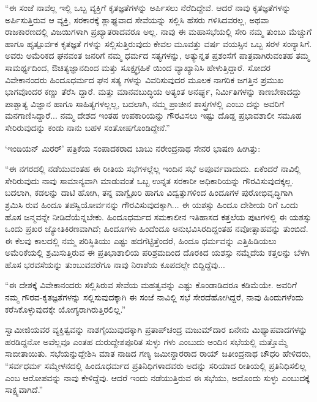 “ಈ ಸಂಜೆ ನಾವೆಲ್ಲ ಇಲ್ಲಿ ಒಬ್ಬ ವ್ಯಕ್ತಿಗೆ ಕೃತಜ್ಞತೆಗಳನ್ನು ಅರ್ಪಿಸಲು ನೆರೆದಿದ್ದೇವೆ. ಆದರೆ ನಾವು ಕೃತಜ್ಞತೆಗಳನ್ನು ಅರ್ಪಿಸುತ್ತಿರುವ ಆ ವ್ಯಕ್ತಿ, ಸರಕಾರಕ್ಕೆ ಶ್ಲಾಘ್ಯವಾದ ಸೇವೆಯನ್ನು ಸಲ್ಲಿಸಿ ಹೆಸರು ಗಳಿಸಿದವರಲ್ಲ, ಅಥವಾ ರಾಜಕಾರಣದಲ್ಲಿ ವಿಜಯಿಗಳಾಗಿ ಪ್ರಖ್ಯಾತರಾದವರೂ ಅಲ್ಲ. ನಾವು ಈ ಮಹಾಸಭೆಯಲ್ಲಿ ಸೇರಿ ನಮ್ಮ ತುಂಬು ಮೆಚ್ಚುಗೆ ಹಾಗೂ ಹೃತ್ಪೂರ್ವಕ ಕೃತಜ್ಞತೆ ಗಳನ್ನು ಸಲ್ಲಿಸುತ್ತಿರುವುದು ಕೇವಲ ಮೂವತ್ತು ವರ್ಷ ವಯಸ್ಸಿನ ಒಬ್ಬ ಸರಳ ಸಂನ್ಯಾಸಿಗೆ. ಅವರು ಅಮೆರಿಕದ ಘನವಂತ ಜನರಿಗೆ ನಮ್ಮ ಧರ್ಮದ ಸತ್ಯಗಳನ್ನು, ಅತ್ಯುನ್ನತ ಪ್ರಶಂಸೆಗೆ ಪಾತ್ರವಾಗಿರುವಂತಹ ತಮ್ಮ ಸಾಮರ್ಥ್ಯದಿಂದ, ಔಚಿತ್ಯಜ್ಞಾನದಿಂದ ಮತ್ತು ಸೂಕ್ಷ್ಮಗ್ರಹಿಕೆ ಯಿಂದ ವ್ಯಾಖ್ಯಾನಿಸಿ ಹೇಳುತ್ತಿದ್ದಾರೆ. ಸೋದರ ವಿವೇಕಾನಂದರು ಹಿಂದೂಧರ್ಮದ ಘನ ಸತ್ಯ ಗಳನ್ನು ವಿವರಿಸುವುದರ ಮೂಲಕ ನಾಗರಿಕ ಜಗತ್ತಿನ ಪ್ರಮುಖ ಭಾಗವೊಂದರ ಕಣ್ಣು ತೆರೆಸಿ ದ್ದಾರೆ. ಮತ್ತು ಮಾನವಬುದ್ಧಿಯ ಅತ್ಯಂತ ಅನರ್ಘ್ಯ, ನಿರ್ಮಿತಿಗಳನ್ನು ಕಾಣಬೇಕಾದದ್ದು ಪಾಶ್ಚಾತ್ಯ ವಿಜ್ಞಾನ ಹಾಗೂ ಸಾಹಿತ್ಯಗಳಲ್ಲಲ್ಲ, ಬದಲಾಗಿ, ನಮ್ಮ ಪ್ರಾಚೀನ ಶಾಸ್ತ್ರಗಳಲ್ಲಿ ಎಂಬು ದನ್ನು ಅವರಿಗೆ ಮನಗಾಣಿಸಿದ್ದಾರೆ... ನಮ್ಮ ದೇಶದ ಇಂತಹ ಉಪಕಾರಿಯನ್ನು ಗೌರವಿಸಲು ಇಷ್ಟು ದೊಡ್ಡ ಪ್ರಭಾವಶಾಲೀ ಸಮೂಹ ಸೇರಿರುವುದನ್ನು ಕಂಡು ನಾನು ಬಹಳ ಸಂತೋಷಗೊಂಡಿದ್ದೇನೆ.”

‘ಇಂಡಿಯನ್ ಮಿರರ್​’ ಪತ್ರಿಕೆಯ ಸಂಪಾದಕರಾದ ಬಾಬು ನರೇಂದ್ರನಾಥ ಸೇನರ ಭಾಷಣ ಹೀಗಿತ್ತು:

“ಈ ನಗರದಲ್ಲಿ ನಡೆಯುವಂತಹ ಈ ರೀತಿಯ ಸಭೆಗಳಲ್ಲೆಲ್ಲ ಇಂದಿನ ಸಭೆ ಅಪೂರ್ವವಾದುದು. ಏಕೆಂದರೆ ನಾವಿಲ್ಲಿ ಸೇರಿರುವುದು ನಾವು ಸಾಮಾನ್ಯವಾಗಿ ಮಾಡುವಂತೆ ಒಬ್ಬ ಉನ್ನತ ಸರಕಾರೀ ಅಧಿಕಾರಿಯನ್ನು ಗೌರವಿಸುವುದಕ್ಕಲ್ಲ. ಬದಲಾಗಿ, ಕಡಲನ್ನು ದಾಟಿ ಹೋಗಿ, ತನ್ನ ವಾಗ್ವೈಖರಿ ಹಾಗೂ ವಿದ್ವತ್ತುಗಳಿಂದ ಹಿಂದೂಗಳ ಪುರೋಭಿವೃದ್ಧಿಗಾಗಿ ಶ್ರಮಿಸಿ ರುವ ಹಿಂದೂ ತಪಸ್ವಿಯೋರ್ವನನ್ನು ಗೌರವಿಸುವುದಕ್ಕಾಗಿ... ಈ ಯಶಸ್ಸು ಹಿಂದೂ ದೇಶೀಯ ರಿಗೆ ಒಂದು ಹೊಸ ಜನ್ಮವನ್ನೇ ನೀಡಿದೆಯೆನ್ನಬೇಕು. ಹಿಂದೂಧರ್ಮದ ಸಮಕಾಲೀನ ಇತಿಹಾಸದ ಕತ್ತಲೆಯ ಪುಟಗಳಲ್ಲಿ ಈ ಯಶಸ್ಸು ಒಂದು ಪ್ರಖರ ಜ್ಯೋತಿಕಿರಣವಾಗಿದೆ; ಹಿಂದೂಗಳು ಹಿಂದೆಂದೂ ಅನುಭವಿಸಿರದಿದ್ದಂತಹ ನವೋತ್ಸಾಹವನ್ನು ತುಂಬಿದೆ. ಈ ಕೆಲವು ಕಾಲದಲ್ಲಿ ನಮ್ಮ ಪರಿಸ್ಥಿತಿಯು ಎಷ್ಟು ಹದಗೆಟ್ಟಿತ್ತೆಂದರೆ, ಹಿಂದೂ ಧರ್ಮವನ್ನು ಎತ್ತಿಹಿಡಿಯಲು ಅಮೆರಿಕೆಯಲ್ಲಿ ಶ್ರಮಿಸುತ್ತಿರುವ ಈ ಪ್ರತಿಭಾಶಾಲಿಯ ಪರಿಶ್ರಮದಿಂದ ದೊರಕಿದ ಯಶಸ್ಸು ನಮ್ಮೆದೆಯ ಕತ್ತಲನ್ನು ಬೆಳಗಿ ಹೊಸ ಭರವಸೆಯನ್ನು ತುಂಬುವವರೆಗೂ ನಾವು ನಿರಾಶೆಯ ಕೂಪದಲ್ಲೇ ಬಿದ್ದಿದ್ದೆವು... 

“ಈ ದೇಶಕ್ಕೆ ವಿವೇಕಾನಂದರು ಸಲ್ಲಿಸಿರುವ ಸೇವೆಯ ಮಹತ್ವವನ್ನು ಎಷ್ಟು ಕೊಂಡಾಡಿದರೂ ಕಡಿಮೆಯೇ. ಅವರಿಗೆ ನಮ್ಮ ಗೌರವ-ಕೃತಜ್ಞತೆಗಳನ್ನು ಸಲ್ಲಿಸುವುದಕ್ಕಾಗಿ ಈ ಸಂಜೆ ನಾವಿಲ್ಲಿ ಸಭೆ ಸೇರದೆಹೋಗಿದ್ದರೆ, ನಾವು ಹಿಂದುಗಳೆಂದು ಕರೆಸಿಕೊಳ್ಳುವುದಕ್ಕೇ ಯೋಗ್ಯರಾಗಿರುತ್ತಿರಲಿಲ್ಲ.”

ಸ್ವಾಮೀಜಿಯವರ ವ್ಯಕ್ತಿತ್ವವನ್ನು ನಾಶಗೈಯುವುದಕ್ಕಾಗಿ ಪ್ರತಾಪ್​ಚಂದ್ರ ಮಜುಮ್​ದಾರ ಏನೇನು ಮಿಥ್ಯಾಪವಾದಗಳನ್ನು ಹರಡಿದ್ದನೋ ಅವೆಲ್ಲವೂ ಎಂತಹ ದುರುದ್ದೇಶಪೂರಿತ ಸುಳ್ಳು ಗಳು ಎಂಬುದು ಅಂದಿನ ಸಭೆಯಲ್ಲಿ ಮತ್ತೊಮ್ಮೆ ಸಾಬೀತಾಯಿತು. ಸಭೆಯನ್ನುದ್ದೇಶಿಸಿ ಮಾತ ನಾಡಿದ ಗಣ್ಯ ಜಮೀನ್ದಾರರಾದ ರಾಯ್ ಜತೀಂದ್ರನಾಥ ಚೌಧರಿ ಹೇಳಿದರು, “ಸರ್ವಧರ್ಮ ಸಮ್ಮೇಳನದಲ್ಲಿ ಹಿಂದೂಧರ್ಮದ ಪ್ರತಿನಿಧಿಗಳಾದವರು ಅದನ್ನು ಸರಿಯಾದ ರೀತಿಯಲ್ಲಿ ಪ್ರತಿನಿಧಿಸಲಿಲ್ಲ ಎಂಬ ಆರೋಪವನ್ನು ನಾವು ಕೇಳಿದ್ದೆವು. ಆದರೆ ಇಂದು ನಡೆಯುತ್ತಿರುವ ಈ ಸಭೆಯು, ಅದೊಂದು ಸುಳ್ಳು ಎಂಬುದಕ್ಕೆ ಸಾಕ್ಷ್ಯವಾಗಿದೆ.”

